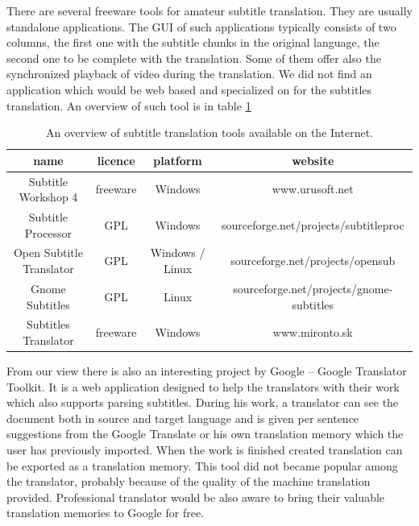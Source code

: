 There are several freeware tools for amateur subtitle translation. They are usually standalone applications. The GUI of such applications typically consists of two columns, the first one with the subtitle chunks in the original language, the second one to be complete with the translation. Some of them offer also the synchronized playback of video during the translation. We did not find an application which would be web based and specialized on for the subtitles translation. An overview of such tool is in table \ref{subtitles_tools}

\begin{table}[h]

\begin{center}
\begin{tabular}{|c|c|c|c|}
\hline
\bf name & \bf licence & \bf platform & \bf website \\
\hline
Subtitle Workshop 4 & freeware & Windows & www.urusoft.net \\
\hline
Subtitle Processor & GPL & Windows & sourceforge.net/projects/subtitleproc \\
\hline
Open Subtitle Translator & GPL & Windows / Linux & sourceforge.net/projects/opensub \\
\hline
Gnome Subtitles & GPL & Linux & sourceforge.net/projects/gnome-subtitles \\
\hline
Subtitles Translator & freeware & Windows & www.mironto.sk \\ \hline

\end{tabular}
\end{center}

\caption{An overview of subtitle translation tools available on the Internet.} \label{subtitles_tools}
\end{table}

From our view there is also an interesting project by Google -- Google Translator Toolkit. It is a web application designed to help the translators with their work which also supports parsing subtitles. During his work, a translator can see the document both in source and target language and is given per sentence suggestions from the Google Translate or his own translation memory which the user has previously imported. When the work is finished created translation can be exported as a translation memory. This tool did not became popular among the translator, probably because of the quality of the machine translation provided. Professional translator would be also aware to bring their valuable translation memories to Google for free. 

